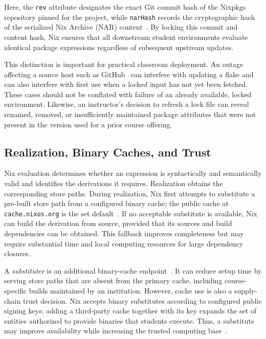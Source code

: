 Here, the \texttt{rev} attribute designates the exact Git commit hash of the Nixpkgs
repository pinned for the project, while \texttt{narHash} records the cryptographic
hash of the serialized Nix Archive (NAR) content~\cite{ContentAddressingFileSystem}.
By locking this commit and content hash, Nix ensures that all downstream student environments
evaluate identical package expressions regardless of subsequent upstream updates.

This distinction is important for practical classroom deployment. An outage
affecting a source host such as GitHub~\cite{GitHubActionsHit2026} can interfere
with updating a flake and can also interfere with first use when a locked input
has not yet been fetched. These cases should not be conflated with failure of an already
available, locked environment. Likewise, an instructor's decision to refresh a
lock file can reveal renamed, removed, or insufficiently maintained package
attributes that were not present in the version used for a prior course offering.

\subsection{Realization, Binary Caches, and Trust}

Nix evaluation determines whether an expression is syntactically and semantically
valid and identifies the derivations it requires. Realization obtains the
corresponding store paths. During realization, Nix first attempts to substitute
a pre-built store path from a configured binary cache; the public cache at \texttt{cache.nixos.org}
is the set default~\cite{BinaryCacheOfficial,malkaDoesFunctionalPackage2025}. If no
acceptable substitute is available, Nix can build the derivation from source, provided
that its sources and build dependencies can be obtained. This fallback improves
completeness but may require substantial time and local computing resources for
large dependency closures.

A \emph{substituter} is an additional binary-cache endpoint~\cite{BinaryCacheOfficial}.
It can reduce setup time by serving store paths that are absent from the primary
cache, including course-specific builds maintained by an institution. However, cache
use is also a supply-chain trust decision. Nix accepts binary substitutes
according to configured public signing keys; adding a third-party cache together with
its key expands the set of entities authorized to provide binaries that students execute.
Thus, a substitute may improve availability while increasing the trusted computing
base~\cite{dolstraNixSafePolicyFree,GarnixBlogStop}.

